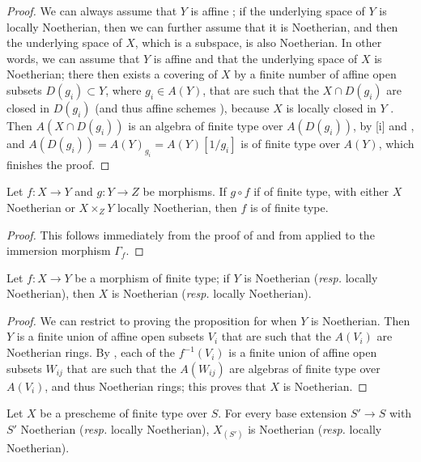 \begin{proof}
\label{proof-1.6.3.5}
We can always assume that $Y$ is affine ;
if the underlying space of $Y$ is locally Noetherian, then we can further assume that it is Noetherian, and then the underlying space of $X$, which is a subspace, is also Noetherian.
In other words, we can assume that $Y$ is affine and that the underlying space of $X$ is Noetherian;
there then exists a covering of $X$ by a finite number of affine open subsets $D(g_i)\subset Y$, where $g_i\in A(Y)$, that are such that the $X\cap D(g_i)$ are closed in $D(g_i)$ (and thus affine schemes ), because $X$ is locally closed in $Y$ .
Then $A(X\cap D(g_i))$ is an algebra of finite type over $A(D(g_i))$, by [i] and , and $A(D(g_i))=A(Y)_{g_i}=A(Y)[1/g_i]$ is of finite type over $A(Y)$, which finishes the proof.
\end{proof}

\begin{cor}[6.3.6]
\label{1.6.3.6}
Let $f:X\to Y$ and $g:Y\to Z$ be morphisms.
If $g\circ f$ if of finite type, with either $X$ Noetherian or $X\times_Z Y$ locally Noetherian, then $f$ is of finite type.
\end{cor}

\begin{proof}
\label{proof-1.6.3.6}
This follows immediately from the proof of  and from  applied to the immersion morphism $\Gamma_f$.
\end{proof}

\begin{prop}[6.3.7]
\label{1.6.3.7}
Let $f:X\to Y$ be a morphism of finite type;
if $Y$ is Noetherian (\emph{resp.} locally Noetherian), then $X$ is Noetherian (\emph{resp.} locally Noetherian).
\end{prop}

\begin{proof}
\label{proof-1.6.3.7}
We can restrict to proving the proposition for when $Y$ is Noetherian.
Then $Y$ is a finite union of affine open subsets $V_i$ that are such that the $A(V_i)$ are Noetherian rings.
By , each of the $f^{-1}(V_i)$ is a finite union of affine open subsets $W_{ij}$ that are such that the $A(W_{ij})$ are algebras of finite type over $A(V_i)$, and thus Noetherian rings;
this proves that $X$ is Noetherian.
\end{proof}

\begin{cor}[6.3.8]
\label{1.6.3.8}
Let $X$ be a prescheme of finite type over $S$.
For every base extension $S'\to S$ with $S'$ Noetherian (\emph{resp.} locally Noetherian), $X_{(S')}$ is Noetherian (\emph{resp.} locally Noetherian).
\end{cor}

